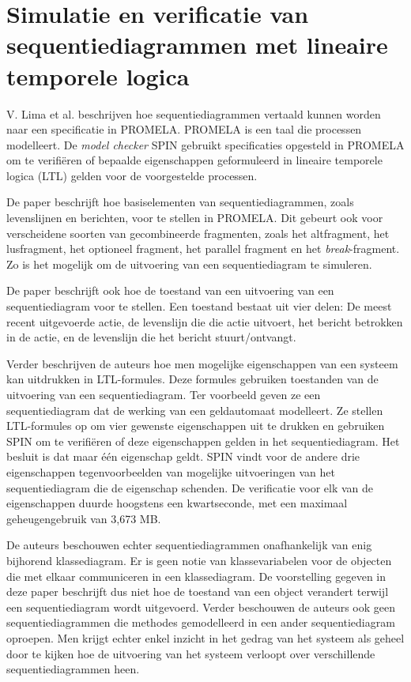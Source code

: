 \section{Simulatie en verificatie van sequentiediagrammen met lineaire temporele logica}

V. Lima et al.\cite{LIMA2009143} beschrijven hoe sequentiediagrammen vertaald kunnen worden naar een specificatie in PROMELA\cite{neumann2014using}. PROMELA is een taal die processen modelleert. De \textit{model checker} SPIN\cite{holzmann2004spin} gebruikt specificaties opgesteld in PROMELA om te verifi\"eren of bepaalde eigenschappen geformuleerd in lineaire temporele logica (LTL) gelden voor de voorgestelde processen.

De paper beschrijft hoe basiselementen van sequentiediagrammen, zoals levenslijnen en berichten, voor te stellen in PROMELA. Dit gebeurt ook voor verscheidene soorten van gecombineerde fragmenten, zoals het altfragment, het lusfragment, het optioneel fragment, het parallel fragment en het \textit{break}-fragment. Zo is het mogelijk om de uitvoering van een sequentiediagram te simuleren.

De paper beschrijft ook hoe de toestand van een uitvoering van een sequentiediagram voor te stellen. Een toestand bestaat uit vier delen: De meest recent uitgevoerde actie, de levenslijn die die actie uitvoert, het bericht betrokken in de actie, en de levenslijn die het bericht stuurt/ontvangt.

Verder beschrijven de auteurs hoe men mogelijke eigenschappen van een systeem kan uitdrukken in LTL-formules. Deze formules gebruiken toestanden van de uitvoering van een sequentiediagram. Ter voorbeeld geven ze een sequentiediagram dat de werking van een geldautomaat modelleert. Ze stellen LTL-formules op om vier gewenste eigenschappen uit te drukken en gebruiken SPIN om te verifi\"eren of deze eigenschappen gelden in het sequentiediagram. Het besluit is dat maar \'e\'en eigenschap geldt. SPIN vindt voor de andere drie eigenschappen tegenvoorbeelden van mogelijke uitvoeringen van het sequentiediagram die de eigenschap schenden. De verificatie voor elk van de eigenschappen duurde hoogstens een kwartseconde, met een maximaal geheugengebruik van 3,673 MB.

De auteurs beschouwen echter sequentiediagrammen onafhankelijk van enig bijhorend klassediagram. Er is geen notie van klassevariabelen voor de objecten die met elkaar communiceren in een klassediagram. De voorstelling gegeven in deze paper beschrijft dus niet hoe de toestand van een object verandert terwijl een sequentiediagram wordt uitgevoerd. Verder beschouwen de auteurs ook geen sequentiediagrammen die methodes gemodelleerd in een ander sequentiediagram oproepen. Men krijgt echter enkel inzicht in het gedrag van het systeem als geheel door te kijken hoe de uitvoering van het systeem verloopt over verschillende sequentiediagrammen heen.

